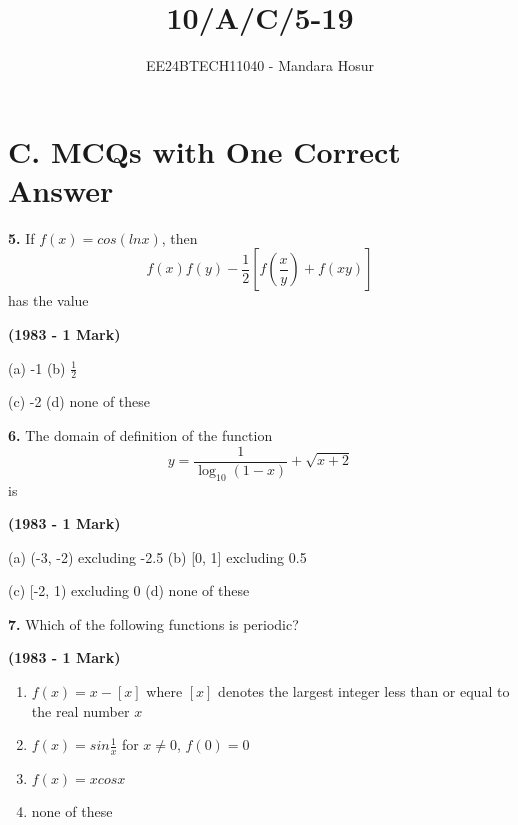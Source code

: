 \documentclass[journal,12pt,twocolumn]{IEEEtran}
\theoremstyle{remark}
\begin{document}

\vspace{3cm}

\title{10/A/C/5-19}
\author{EE24BTECH11040 - Mandara Hosur}
\maketitle
\newpage
\bigskip

\renewcommand{\thefigure}{\theenumi}
\renewcommand{\thetable}{\theenumi}

\section*{\textbf{C. MCQs with One Correct Answer}}

\textbf{5.} If $f(x) = cos(ln x)$, then $$f(x)f(y)-\frac{1}{2} \left[f\left(\frac{x}{y}\right)+f(xy)\right]$$ has the value

\hfill{\textbf{(1983 - 1 Mark)}}

\begin{tabbing}
	(a) -1 \hspace{.8em} (b) $\frac{1}{2}$
\end{tabbing}

\begin{tabbing}
	(c) -2 \hspace{.8em} (d) none of these
\end{tabbing}

\textbf{6.} The domain of definition of the function
$$y = \frac{1}{\log_{10}{(1-x)}} + \sqrt{x+2}$$ is

\hfill{\textbf{(1983 - 1 Mark)}}

\begin{tabbing}
	(a) (-3, -2) excluding -2.5 \hspace{.8em} (b) [0, 1] excluding 0.5
\end{tabbing}

\begin{tabbing}
	(c) [-2, 1) excluding 0 \hspace{.8em} (d) none of these
\end{tabbing}

\textbf{7.} Which of the following functions is periodic?

\hfill{\textbf{(1983 - 1 Mark)}}

\begin{enumerate}
\item[(a)] $f(x)=x-\left[x\right]$ where $\left[x\right]$ denotes the largest integer less than or equal to the real number $x$
\item[(b)] $f(x)=sin\frac{1}{x}$ for $x\neq0$, $f(0)=0$
\item[(c)] $f(x)=xcosx$
\item[(d)] none of these
\end{enumerate}
\end{document}
